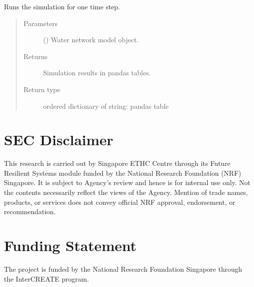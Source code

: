 \documentclass[letterpaper,10pt,english]{sphinxmanual}
\begin{document}
\begin{fulllineitems}
\label{\detokenize{apidoc:dreaminsg_integrated_model.src.network_sim_models.water.water_network_model.run_water_simulation}}
\sphinxAtStartPar
Runs the simulation for one time step.
\begin{quote}\begin{description}
\item[{Parameters}] \leavevmode
\sphinxAtStartPar
{} (\sphinxstyleliteralemphasis{\sphinxupquote{{[}}}\sphinxstyleliteralemphasis{\sphinxupquote{{]}}}) \textendash{} Water network model object.

\item[{Returns}] \leavevmode
\sphinxAtStartPar
Simulation results in pandas tables.

\item[{Return type}] \leavevmode
\sphinxAtStartPar
ordered dictionary of string: pandas table

\end{description}\end{quote}

\end{fulllineitems}



\chapter{SEC Disclaimer}
\label{\detokenize{index:sec-disclaimer}}
\sphinxAtStartPar
This research is carried out by Singapore ETHC Centre through its Future Resilient Systems module
funded by the National Research Foundation (NRF) Singapore. It is subject to Agency’s review and hence is for internal use only.
Not the contents necessarily reflect the views of the Agency. Mention of trade names, products, or services does not convey official
NRF approval, endorsement, or recommendation.


\chapter{Funding Statement}
\label{\detokenize{index:funding-statement}}
\sphinxAtStartPar
The project is funded by the National Research Foundation Singapore through the Inter\sphinxhyphen{}CREATE program.
\end{document}
